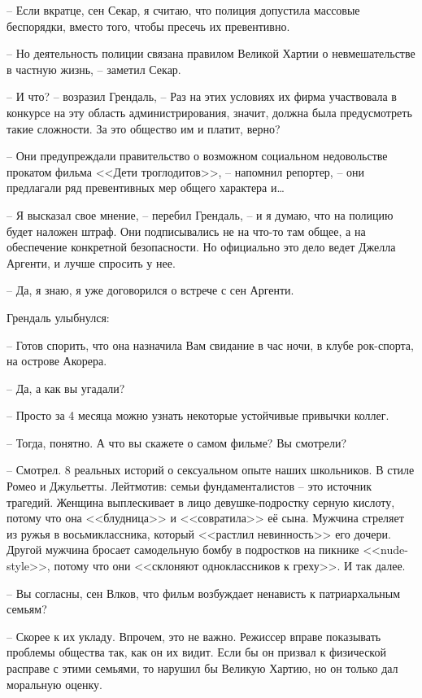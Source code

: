 -- Если вкратце, сен Секар, я считаю, что полиция допустила массовые беспорядки, вместо того, чтобы пресечь их превентивно.

-- Но деятельность полиции связана правилом Великой Хартии о невмешательстве в частную жизнь, -- заметил Секар.

-- И что? -- возразил Грендаль, -- Раз на этих условиях их фирма участвовала в конкурсе на эту область администрирования, значит, должна была предусмотреть такие сложности. За это общество им и платит, верно?

-- Они предупреждали правительство о возможном социальном недовольстве прокатом фильма <<Дети троглодитов>>, -- напомнил репортер, -- они предлагали ряд превентивных мер общего характера и\ldots{}

-- Я высказал свое мнение, -- перебил Грендаль, -- и я думаю, что на полицию будет наложен штраф. Они подписывались не на что-то там общее, а на обеспечение конкретной безопасности. Но официально это дело ведет Джелла Аргенти, и лучше спросить у нее.

-- Да, я знаю, я уже договорился о встрече с сен Аргенти.

Грендаль улыбнулся:

-- Готов спорить, что она назначила Вам свидание в час ночи, в клубе рок-спорта, на острове Акорера.

-- Да, а как вы угадали?

-- Просто за 4 месяца можно узнать некоторые устойчивые привычки коллег.

-- Тогда, понятно. А что вы скажете о самом фильме? Вы смотрели?

-- Смотрел. 8 реальных историй о сексуальном опыте наших школьников. В стиле Ромео и Джульетты. Лейтмотив: семьи фундаменталистов -- это источник трагедий. Женщина выплескивает в лицо девушке-подростку серную кислоту, потому что она <<блудница>> и <<совратила>> её сына. Мужчина стреляет из ружья в восьмиклассника, который <<растлил невинность>> его дочери. Другой мужчина бросает самодельную бомбу в подростков на пикнике <<nude-style>>, потому что они <<склоняют одноклассников к греху>>. И так далее.

-- Вы согласны, сен Влков, что фильм возбуждает ненависть к патриархальным семьям?

-- Скорее к их укладу. Впрочем, это не важно. Режиссер вправе показывать проблемы общества так, как он их видит. Если бы он призвал к физической расправе с этими семьями, то нарушил бы Великую Хартию, но он только дал моральную оценку.

